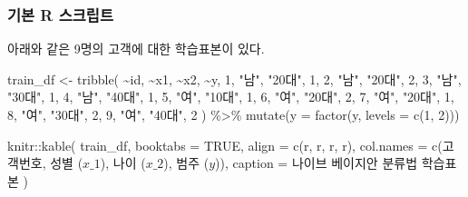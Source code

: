\documentclass[
]{book}
\newenvironment{Shaded}{\begin{snugshade}}{\end{snugshade}}
\newcommand{\AttributeTok}[1]{\textcolor[rgb]{0.77,0.63,0.00}{#1}}
\newcommand{\ConstantTok}[1]{\textcolor[rgb]{0.00,0.00,0.00}{#1}}
\newcommand{\DecValTok}[1]{\textcolor[rgb]{0.00,0.00,0.81}{#1}}
\newcommand{\FunctionTok}[1]{\textcolor[rgb]{0.00,0.00,0.00}{#1}}
\newcommand{\NormalTok}[1]{#1}
\newcommand{\OtherTok}[1]{\textcolor[rgb]{0.56,0.35,0.01}{#1}}
\newcommand{\SpecialCharTok}[1]{\textcolor[rgb]{0.00,0.00,0.00}{#1}}
\newcommand{\StringTok}[1]{\textcolor[rgb]{0.31,0.60,0.02}{#1}}
\begin{document}
\hypertarget{naive-bayes-basic-script}{%
\subsubsection{기본 R 스크립트}\label{naive-bayes-basic-script}}

아래와 같은 9명의 고객에 대한 학습표본이 있다.

\begin{Shaded}
\begin{Highlighting}[]
\NormalTok{train\_df }\OtherTok{\textless{}{-}} \FunctionTok{tribble}\NormalTok{(}
  \SpecialCharTok{\textasciitilde{}}\NormalTok{id, }\SpecialCharTok{\textasciitilde{}}\NormalTok{x1, }\SpecialCharTok{\textasciitilde{}}\NormalTok{x2, }\SpecialCharTok{\textasciitilde{}}\NormalTok{y,}
  \DecValTok{1}\NormalTok{, }\StringTok{"남"}\NormalTok{, }\StringTok{"20대"}\NormalTok{, }\DecValTok{1}\NormalTok{,}
  \DecValTok{2}\NormalTok{, }\StringTok{"남"}\NormalTok{, }\StringTok{"20대"}\NormalTok{, }\DecValTok{2}\NormalTok{,}
  \DecValTok{3}\NormalTok{, }\StringTok{"남"}\NormalTok{, }\StringTok{"30대"}\NormalTok{, }\DecValTok{1}\NormalTok{,}
  \DecValTok{4}\NormalTok{, }\StringTok{"남"}\NormalTok{, }\StringTok{"40대"}\NormalTok{, }\DecValTok{1}\NormalTok{,}
  \DecValTok{5}\NormalTok{, }\StringTok{"여"}\NormalTok{, }\StringTok{"10대"}\NormalTok{, }\DecValTok{1}\NormalTok{,}
  \DecValTok{6}\NormalTok{, }\StringTok{"여"}\NormalTok{, }\StringTok{"20대"}\NormalTok{, }\DecValTok{2}\NormalTok{,}
  \DecValTok{7}\NormalTok{, }\StringTok{"여"}\NormalTok{, }\StringTok{"20대"}\NormalTok{, }\DecValTok{1}\NormalTok{,}
  \DecValTok{8}\NormalTok{, }\StringTok{"여"}\NormalTok{, }\StringTok{"30대"}\NormalTok{, }\DecValTok{2}\NormalTok{,}
  \DecValTok{9}\NormalTok{, }\StringTok{"여"}\NormalTok{, }\StringTok{"40대"}\NormalTok{, }\DecValTok{2}
\NormalTok{) }\SpecialCharTok{\%\textgreater{}\%}
  \FunctionTok{mutate}\NormalTok{(}\AttributeTok{y =} \FunctionTok{factor}\NormalTok{(y, }\AttributeTok{levels =} \FunctionTok{c}\NormalTok{(}\DecValTok{1}\NormalTok{, }\DecValTok{2}\NormalTok{)))}

\NormalTok{knitr}\SpecialCharTok{::}\FunctionTok{kable}\NormalTok{(}
\NormalTok{  train\_df, }\AttributeTok{booktabs =} \ConstantTok{TRUE}\NormalTok{,}
  \AttributeTok{align =} \FunctionTok{c}\NormalTok{(}\StringTok{\textquotesingle{}r\textquotesingle{}}\NormalTok{, }\StringTok{\textquotesingle{}r\textquotesingle{}}\NormalTok{, }\StringTok{\textquotesingle{}r\textquotesingle{}}\NormalTok{, }\StringTok{\textquotesingle{}r\textquotesingle{}}\NormalTok{),}
  \AttributeTok{col.names =} \FunctionTok{c}\NormalTok{(}\StringTok{\textquotesingle{}고객번호\textquotesingle{}}\NormalTok{, }\StringTok{\textquotesingle{}성별 ($x\_1$)\textquotesingle{}}\NormalTok{, }\StringTok{\textquotesingle{}나이 ($x\_2$)\textquotesingle{}}\NormalTok{, }\StringTok{\textquotesingle{}범주 ($y$)\textquotesingle{}}\NormalTok{),}
  \AttributeTok{caption =} \StringTok{\textquotesingle{}나이브 베이지안 분류법 학습표본\textquotesingle{}}
\NormalTok{)}
\end{Highlighting}
\end{Shaded}
\end{document}
